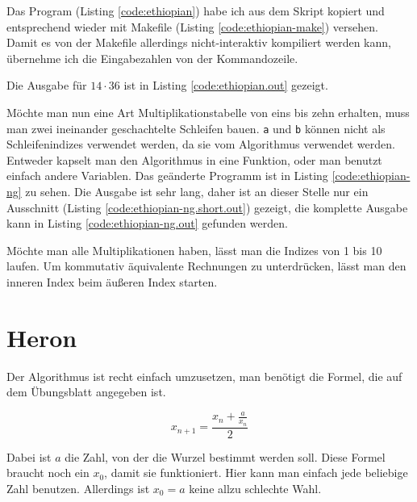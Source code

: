 Das Program (Listing \ref{code:ethiopian}) habe ich aus dem Skript kopiert und entsprechend wieder mit Makefile (Listing \ref{code:ethiopian-make}) versehen. Damit es von der Makefile allerdings nicht-interaktiv kompiliert werden kann, übernehme ich die Eingabezahlen von der Kommandozeile.


Die Ausgabe für $14 \cdot 36$ ist in Listing \ref{code:ethiopian.out} gezeigt.


Möchte man nun eine Art Multiplikationstabelle von eins bis zehn erhalten, muss man zwei ineinander geschachtelte Schleifen bauen. \texttt{a} und \texttt{b} können nicht als Schleifenindizes verwendet werden, da sie vom Algorithmus verwendet werden. Entweder kapselt man den Algorithmus in eine Funktion, oder man benutzt einfach andere Variablen. Das geänderte Programm ist in Listing \ref{code:ethiopian-ng} zu sehen. Die Ausgabe  ist sehr lang, daher ist an dieser Stelle nur ein Ausschnitt (Listing \ref{code:ethiopian-ng.short.out}) gezeigt, die komplette Ausgabe kann in Listing \ref{code:ethiopian-ng.out} gefunden werden.





Möchte man alle Multiplikationen haben, lässt man die Indizes von 1 bis 10 laufen. Um kommutativ äquivalente Rechnungen zu unterdrücken, lässt man den inneren Index beim äußeren Index starten.

\section{Heron}

Der Algorithmus ist recht einfach umzusetzen, man benötigt die Formel, die auf dem Übungsblatt angegeben ist.

\begin{equation}
x_{n+1}=\frac{x_n+\frac{a}{x_n}}{2}
\end{equation}

Dabei ist $a$ die Zahl, von der die Wurzel bestimmt werden soll. Diese Formel braucht noch ein $x_0$, damit sie funktioniert. Hier kann man einfach jede beliebige Zahl benutzen. Allerdings ist $x_0=a$ keine allzu schlechte Wahl.

